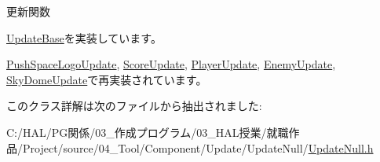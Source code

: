 更新関数 



\mbox{\hyperlink{class_update_base_a9fdc8924001cf6fa89c1f5fa0d867682}{Update\+Base}}を実装しています。



\mbox{\hyperlink{class_push_space_logo_update_aa07fe6f6f4f072e1f81bc6708dd4727e}{Push\+Space\+Logo\+Update}}, \mbox{\hyperlink{class_score_update_aae2b398784079a651ed92eb4c634b1c9}{Score\+Update}}, \mbox{\hyperlink{class_player_update_af6e1b8ca60399f232e64d2acb4968c75}{Player\+Update}}, \mbox{\hyperlink{class_enemy_update_ae9662f3a2d064dc69c0d68293e60f051}{Enemy\+Update}}, \mbox{\hyperlink{class_sky_dome_update_ae163cb90e4de561fe1f7b2cb311be331}{Sky\+Dome\+Update}}で再実装されています。



このクラス詳解は次のファイルから抽出されました\+:\begin{DoxyCompactItemize}
\item 
C\+:/\+H\+A\+L/\+P\+G関係/03\+\_\+作成プログラム/03\+\_\+\+H\+A\+L授業/就職作品/\+Project/source/04\+\_\+\+Tool/\+Component/\+Update/\+Update\+Null/\mbox{\hyperlink{_update_null_8h}{Update\+Null.\+h}}\end{DoxyCompactItemize}
